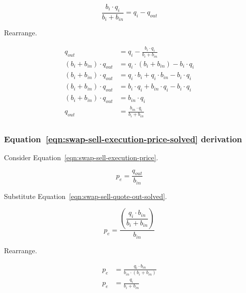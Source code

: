 \documentclass[table, twocolumn]{article}
\begin{document}
\begin{equation}
	\frac{b_i \cdot q_i}{b_i + b_{in}}= q_i - q_{out} \nonumber
\end{equation}

Rearrange.

\begin{align}
	q_{out}                      & = q_i - \frac{b_i \cdot q_i}{b_i + b_{in}} \nonumber \\
	(b_i + b_{in}) \cdot q_{out} & = q_i \cdot (b_i + b_{in}) - b_i \cdot q_i \nonumber \\
	(b_i + b_{in}) \cdot q_{out} & =
	q_i \cdot b_i + q_i \cdot b_{in} - b_i \cdot q_i \nonumber                          \\
	(b_i + b_{in}) \cdot q_{out} & =
	b_i \cdot q_i + b_{in} \cdot q_i - b_i \cdot q_i \nonumber                          \\
	(b_i + b_{in}) \cdot q_{out} & = b_{in} \cdot q_i \nonumber                         \\
	q_{out}                      & = \frac{b_{in} \cdot q_i}{b_i + b_{in}} \nonumber    \\
\end{align}

\subsubsection{Equation~\ref{eqn:swap-sell-execution-price-solved} derivation}%
\label{sssec:equation-eqn-swap-sell-execution-price-solved-derivation}

Consider Equation~\ref{eqn:swap-sell-execution-price}.

\begin{equation}
	p_e = \frac{q_{out}}{b_{in}} \nonumber
\end{equation}

Substitute Equation~\ref{eqn:swap-sell-quote-out-solved}.

\begin{equation}
	p_e = \dfrac{\left(\dfrac{q_i \cdot b_{in}}{b_i + b_{in}}\right)}{b_{in}} \nonumber
\end{equation}

Rearrange.

\begin{align}
	p_e & = \frac{q_i \cdot b_{in}}{b_{in} \cdot (b_i + b_{in})} \nonumber \\
	p_e & = \frac{q_i}{b_i + b_{in}} \nonumber                             \\
\end{align}
\end{document}
